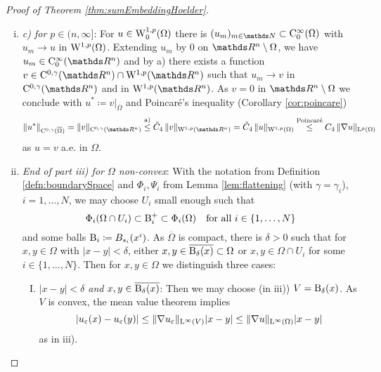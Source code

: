 \begin{proof}[Proof of Theorem \ref{thm:sumEmbeddingHoelder}]
\begin{enumerate}[i)]
  \item \emph{c) for $p \in (n,\infty]$}:
    For $u \in \mathrm{W}_0^{1,p}(\Omega)$ there is $(u_m)_{m \in \N} \subset \CC_0^\infty(\Omega)$ with $u_m \to u$ in $\mathrm{W}^{1,p}(\Omega)$.
    Extending $u_m$ by $0$ on $\R^n \setminus \Omega$, we have $u_m \in \CC_0^\infty(\R^n)$ and by a) there exists a function $v \in \CC^{0,\gamma}(\R^n) \cap \WW^{1,p}(\R^n)$ such that $u_m \to v$ in $\CC^{0,\gamma}(\R^n)$ and in $\WW^{1,p}(\R^n)$.
    As $v = 0$ in $\R^n \setminus \Omega$ we conclude with $u^* \coloneqq v|_{\overline\Omega}$ and Poincar\'e's inequality (Corollary \ref{cor:poincare})
    $$
    \|u^*\|_{\CC^{0,\gamma}(\overline\Omega)}
    = \|v\|_{\CC^{0,\gamma}(\R^n)}
    \overset{\text{a)}}{\leq} \tilde C_4 \, \|v\|_{\WW^{1,p}(\R^n)}
    = \tilde C_4 \, \|u\|_{\WW^{1,p}(\Omega)}
    \overset{\text{Poincar\'e}}{\leq} C_4 \, \|\nabla u\|_{\Ell^p(\Omega)}
    $$
    as $u = v$ a.e. in $\Omega$.

    \item \emph{End of part iii) for $\Omega$ non-convex}:
      With the notation from Definition \ref{defn:boundarySpace} and $\Phi_i, \Psi_i$ from Lemma \ref{lem:flattening} (with $\gamma = \gamma_i$), $i = 1,\dots,N$, we may choose $U_i$ small enough such that 
      $$\Phi_i(\Omega \cap U_i) \subset \mathrm{B}_i^+ \subset \Phi_i(\Omega)\quad\text{for all } i \in \{1,\dots,N\}$$ and some balls $\mathrm{B}_i \coloneqq B_{s_i}(x^i)$.
      As $\overline\Omega$ is compact, there is $\delta > 0$ such that for $x,y \in \Omega$ with $|x - y| < \delta$, either $x,y \in \overline{\mathrm{B}_\delta(x)} \subset \Omega$ or $x, y \in \Omega \cap U_i$ for some $i \in \{1,\dots,N\}$.
      Then for $x,y \in \Omega$ we distinguish three cases:
      \begin{enumerate}[I)]
        \item \emph{$|x -y| < \delta$ and $x,y \in \overline{\mathrm{B}_\delta(x)}$}:
          Then we may choose (in iii)) $V = \mathrm{B}_\delta(x)$.
          As $V$ is convex, the mean value theorem implies 
          $$
          |u_\varepsilon(x) - u_\varepsilon(y)| 
          \leq \| \nabla u_\varepsilon\|_{\mathrm{L}^\infty(V)} |x - y|
          \leq \| \nabla u\|_{\mathrm{L}^\infty(\Omega)} |x - y|
          $$
          as in iii).


\end{enumerate}
\end{enumerate}
\end{proof}
